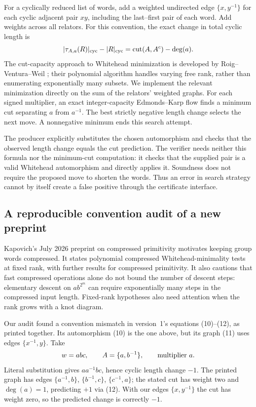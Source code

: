 For a cyclically reduced list of words, add a weighted undirected edge
$\{x,y^{-1}\}$ for each cyclic adjacent pair $xy$, including the last--first
pair of each word.  Add weights across all relators.  For this convention,
the exact change in total cyclic length is
\[
 |\tau_{A,a}(R)|_{\rm cyc}-|R|_{\rm cyc}
   =\operatorname{cut}(A,A^c)-\deg(a).
\]
The cut-capacity approach to Whitehead minimization is developed by
Roig--Ventura--Weil \cite{roig-ventura-weil}; their polynomial algorithm
handles varying free rank, rather than enumerating exponentially many
subsets.  We implement the relevant minimization directly on the sum of
the relators' weighted graphs.  For each signed multiplier, an exact
integer-capacity Edmonds--Karp flow finds a minimum cut separating $a$
from $a^{-1}$.  The best strictly negative length change selects the next
move.  A nonnegative minimum ends this search attempt.

The producer explicitly substitutes the chosen automorphism and checks
that the observed length change equals the cut prediction.  The verifier
needs neither this formula nor the minimum-cut computation: it checks that
the supplied pair is a valid Whitehead automorphism and directly applies
it.  Soundness does not require the proposed move to shorten the words.
Thus an error in search strategy cannot by itself create a false positive
through the certificate interface.

\subsection{A reproducible convention audit of a new preprint}

Kapovich's July 2026 preprint on compressed primitivity
\cite{kapovich-compressed} motivates keeping group words compressed.  It
states polynomial compressed Whitehead-minimality tests at fixed rank,
with further results for compressed primitivity.  It also cautions that
fast compressed operations alone do not bound the number of descent
steps: elementary descent on $a b^{2^m}$ can require exponentially many
steps in the compressed input length.  Fixed-rank hypotheses also need
attention when the rank grows with a knot diagram.

Our audit found a convention mismatch in version~1's equations
(10)--(12), as printed together.  Its automorphism (10) is the one above,
but its graph (11) uses edges $\{x^{-1},y\}$.  Take
\[
 w=abc,\qquad A=\{a,b^{-1}\},\qquad\hbox{multiplier }a.
\]
Literal substitution gives $a a^{-1}bc$, hence cyclic length change $-1$.
The printed graph has edges $\{a^{-1},b\}$, $\{b^{-1},c\}$,
$\{c^{-1},a\}$; the stated cut has weight two and $\deg(a)=1$, predicting
$+1$ via (12).  With our edges $\{x,y^{-1}\}$ the cut has weight zero,
so the predicted change is correctly $-1$.

